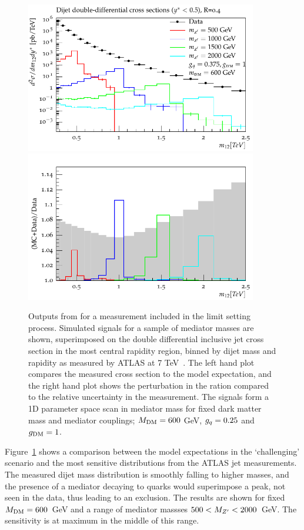 \documentclass[floatfix]{article}
\begin{document}
\begin{figure}[!htb]
\centering
      \includegraphics[width=0.9\textwidth]{images/atlasdijet/fullscale/ATLAS_dijet.pdf}\\
      \includegraphics[width=0.9\textwidth]{images/atlasdijet/ratio/ATLAS_dijet_ratio.pdf}
    \caption{ Outputs from \rivet for a measurement included in the limit setting process. Simulated signals for a sample of mediator masses are shown, superimposed 
on the double differential inclusive jet cross section in the most central rapidity region, binned by dijet mass and rapidity as measured by ATLAS at 
7 TeV~\cite{Aad:2014pua}. The left hand plot compares the measured cross section to the model expectation, and the right hand plot shows the perturbation 
in the ration compared to the relative uncertainty in the measurement. 
The signals form a 1D parameter space scan in mediator mass for fixed dark matter mass and mediator couplings; $M_{\rm DM}=600$ GeV, 
$g_{q}=0.25$ and $g_{\rm DM} = 1$.}
\label{fig:ATLASdijet}
\end{figure}

Figure~\ref{fig:ATLASdijet} shows a comparison between the model expectations in the `challenging' scenario and the most sensitive distributions from the ATLAS jet measurements. The measured 
dijet mass distribution is smoothly falling to higher masses, and the presence of a mediator decaying to quarks would superimpose a
peak, not seen in the data, thus leading to an exclusion. The results are shown for fixed $M_{\rm DM} = 600$~GeV and a range of mediator massses $500 < M_{Z^{\prime}} < 2000$~GeV. 
The sensitivity is at maximum in the middle of this range.
\end{document}
